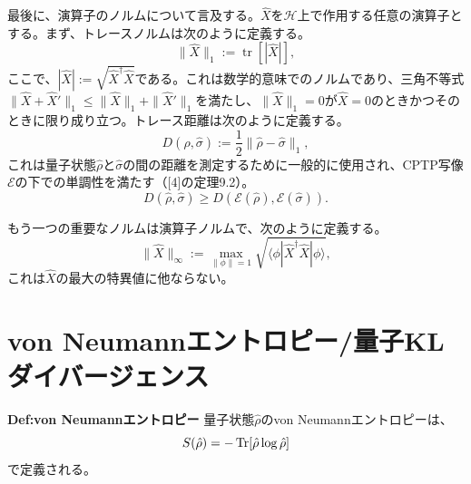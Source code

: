 \documentclass[a4paper,11pt]{jsarticle}
\numberwithin{equation}{section}
\begin{document}
最後に、演算子のノルムについて言及する。$\hat{X}$を$\mathcal{H}$上で作用する任意の演算子とする。まず、トレースノルムは次のように定義する。
\begin{equation}
\|\hat{X}\|_1 := \operatorname{tr}[|\hat{X}|],
\end{equation}
ここで、$|\hat{X}| := \sqrt{\hat{X}^\dagger \hat{X}}$である。これは数学的意味でのノルムであり、三角不等式$\|\hat{X} + \hat{X}'\|_1 \leq \|\hat{X}\|_1 + \|\hat{X}'\|_1$を満たし、$\|\hat{X}\|_1 = 0$が$\hat{X} = 0$のときかつそのときに限り成り立つ。トレース距離は次のように定義する。
\begin{equation}
D(\hat{\rho}, \hat{\sigma}) := \frac{1}{2} \|\hat{\rho} - \hat{\sigma}\|_1,
\end{equation}
これは量子状態$\hat{\rho}$と$\hat{\sigma}$の間の距離を測定するために一般的に使用され、CPTP写像$\mathcal{E}$の下での単調性を満たす（[4]の定理9.2）。
\begin{equation}
D(\hat{\rho}, \hat{\sigma}) \geq D(\mathcal{E}(\hat{\rho}), \mathcal{E}(\hat{\sigma})).
\end{equation}

もう一つの重要なノルムは演算子ノルムで、次のように定義する。
\begin{equation}
\|\hat{X}\|_\infty := \max_{\|\phi\|=1} \sqrt{\langle \phi | \hat{X}^\dagger \hat{X} | \phi \rangle},
\end{equation}
これは$\hat{X}$の最大の特異値に他ならない。

\newpage
\section{von Neumannエントロピー/量子KLダイバージェンス}

\begin{itembox}[l]{\textbf{Def:von Neumannエントロピー}}
        量子状態$\hat{\rho}$のvon Neumannエントロピーは、
        \begin{equation}
            S(\hat{\rho}) = -\Trace[\hat{\rho}\log \hat{\rho}]
        \end{equation}
        で定義される。

\end{itembox}
\end{document}
